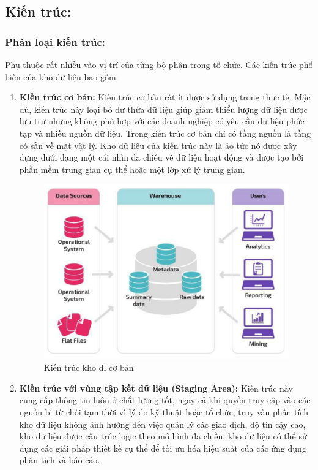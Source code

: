 \subsection{Kiến trúc:}
\subsubsection{Phân loại kiến trúc:}
Phụ thuộc rất nhiều vào vị trí của từng bộ phận trong tổ chức. Các kiến trúc phổ biến của kho dữ liệu bao gồm:
\begin{enumerate}
    \item \textbf{Kiến trúc cơ bản:}
    Kiến trúc cơ bản rất ít được sử dụng trong thực tế. Mặc dù, kiến trúc này loại bỏ dư thừa dữ liệu giúp giảm thiểu lượng dữ liệu được lưu trữ nhưng không phù hợp với các doanh nghiệp có yêu cầu dữ liệu phức tạp và nhiều nguồn dữ liệu. Trong kiến trúc cơ bản chỉ có tầng nguồn là tầng có sẵn về mặt vật lý. Kho dữ liệu của kiến trúc này là ảo tức nó được xây dựng dưới dạng một cái nhìn đa chiều về dữ liệu hoạt động và được tạo bởi phần mềm trung gian cụ thể hoặc một lớp xử lý trung gian.
    \begin{center}
            \begin{figure}[!h]
                \centering
                \includegraphics[scale = 1]{figures/Duyen/Kiến trúc kho dl cơ bản.PNG}
              \caption{Kiến trúc kho dl cơ bản}
            \end{figure}
\end{center}
    \item \textbf{Kiến trúc với vùng tập kết dữ liệu (Staging Area):} Kiến trúc này cung cấp thông tin luôn ở chất lượng tốt, ngay cả khi quyền truy cập vào các nguồn bị từ chối tạm thời vì lý do kỹ thuật hoặc tổ chức; truy vấn phân tích kho dữ liệu không ảnh hưởng đến việc quản lý các giao dịch, độ tin cậy cao, kho dữ liệu được cấu trúc logic theo mô hình đa chiều, kho dữ liệu có thể sử dụng các giải pháp thiết kế cụ thể để tối ưu hóa hiệu suất của các ứng dụng phân tích và báo cáo.

\end{enumerate}
